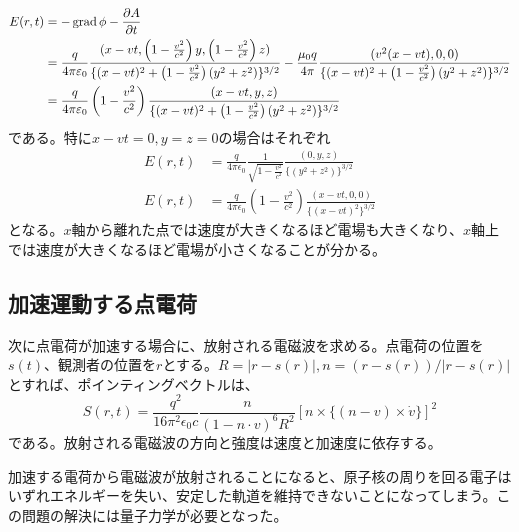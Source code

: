     \begin{align*}
        E(r, t)
        &= -\operatorname{grad}\phi - \pdv{A}{t}\\
        &= \frac{q}{4\pi\varepsilon_0}\frac{(x - vt, \left(1 - \frac{v^2}{c^2}\right)y, \left(1 - \frac{v^2}{c^2}\right)z)}{\{(x - vt)^2 + \left(1 - \frac{v^2}{c^2}\right)(y^2 + z^2)\}^{3/2}} - \frac{\mu_0q}{4\pi}\frac{(v^2(x - vt), 0, 0)}{\{(x - vt)^2 + \left(1 - \frac{v^2}{c^2}\right)(y^2 + z^2)\}^{3/2}}\\
        &= \frac{q}{4\pi\varepsilon_0}\left(1 - \frac{v^2}{c^2}\right)\frac{(x - vt, y, z)}{\{(x - vt)^2 + \left(1 - \frac{v^2}{c^2}\right)(y^2 + z^2)\}^{3/2}}
    \end{align*}
    である。特に$x - vt = 0, y = z = 0$の場合はそれぞれ
    \begin{align*}
        E(r, t) &= \frac{q}{4\pi\epsilon_0}\frac{1}{\sqrt{1 - \frac{v^2}{c^2}}}\frac{(0, y, z)}{\{(y^2 + z^2)\}^{3/2}}\\
        E(r, t) &= \frac{q}{4\pi\epsilon_0}\left(1 - \frac{v^2}{c^2}\right)\frac{(x - vt, 0, 0)}{\{(x - vt)^2\}^{3/2}}
    \end{align*}
    となる。$x$軸から離れた点では速度が大きくなるほど電場も大きくなり、$x$軸上では速度が大きくなるほど電場が小さくなることが分かる。

\subsection{加速運動する点電荷}
    次に点電荷が加速する場合に、放射される電磁波を求める。点電荷の位置を$s(t)$、観測者の位置を$r$とする。$R = |r-s(r)|,n = (r-s(r))/|r-s(r)|$とすれば、ポインティングベクトルは、
        \[S(r, t) = \frac{q^2}{16\pi^2\epsilon_0c}\frac{n}{(1 - n \cdot v)^6R^2}[n \times \{(n - v) \times \dot{v}\}]^2\]
    である。放射される電磁波の方向と強度は速度と加速度に依存する。

    加速する電荷から電磁波が放射されることになると、原子核の周りを回る電子はいずれエネルギーを失い、安定した軌道を維持できないことになってしまう。この問題の解決には量子力学が必要となった。